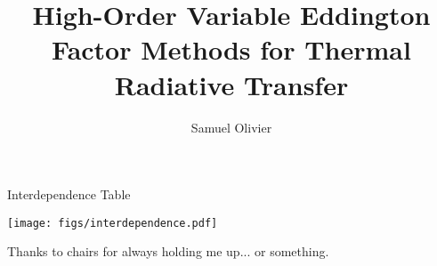 \documentclass[todo]{dissertation}
\begin{document}
\title{High-Order Variable Eddington Factor Methods for Thermal Radiative Transfer}
\author{Samuel Olivier}
\maketitle

\copyrightpage



\begin{frontmatter}

\begin{KeepFromToc}
\tableofcontents
\end{KeepFromToc}
\clearpage

\begin{preamble}{Interdependence Table}
\vfill
\begin{center}
\texttt{[image: figs/interdependence.pdf]}
\end{center}
\end{preamble}

\printglossary[style=april_gloss_style]
\clearpage


\begin{preamble}{\acknowledgename}
Thanks to chairs for always holding me up... or something. 
\end{preamble}
\end{frontmatter}

\glsresetall %
\pagestyle{headings}











\clearpage
\printbibliography
\appendix 

\end{document}
